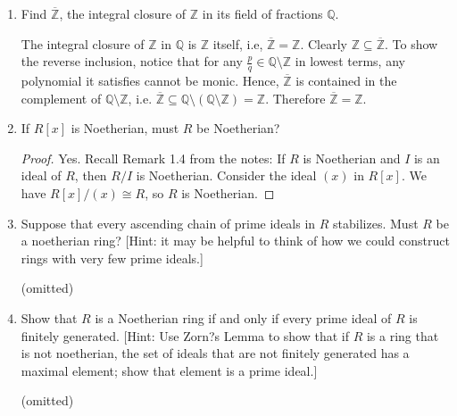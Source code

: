 \documentclass[11pt,oneside,english]{amsart}
\theoremstyle{definition}
\newcommand{\MB}[1]{\mathbb{#1}}
\begin{document}
\begin{enumerate}[leftmargin=*]
\item Find $\overline{\MB{Z}}$, the integral closure of $\MB{Z}$ in its field of fractions $\MB{Q}$.


The integral closure of $\MB{Z}$ in $\MB{Q}$ is $\MB{Z}$ itself, i.e, $\overline{\MB{Z}}=\MB{Z}$. Clearly $\MB{Z}\subseteq\overline{\MB{Z}}$. To show the reverse inclusion, notice that for any $\frac{p}{q}\in\MB{Q}\setminus\MB{Z}$ in lowest terms, any polynomial it satisfies cannot be monic. Hence, $\overline{\MB{Z}}$ is contained in the complement of $\MB{Q}\setminus\MB{Z}$, i.e. $\overline{\MB{Z}}\subseteq\MB{Q}\setminus(\MB{Q}\setminus\MB{Z})=\MB{Z}$. Therefore $\overline{\MB{Z}}=\MB{Z}$.



\item If $R[x]$ is Noetherian, must $R$ be Noetherian?


\begin{proof}
Yes. Recall Remark 1.4 from the notes: If $R$ is Noetherian and $I$ is an ideal of $R$, then $R/I$ is Noetherian. Consider the ideal $(x)$ in $R[x]$. We have $R[x]/(x)\cong R$, so $R$ is Noetherian.
\end{proof}


\item Suppose that every ascending chain of prime ideals in $R$ stabilizes. Must $R$ be a noetherian ring? [Hint: it may be helpful to think of how we could construct rings with very few prime ideals.]

(omitted)

\item Show that $R$ is a Noetherian ring if and only if every prime ideal of $R$ is finitely generated. [Hint: Use Zorn?s Lemma to show that if $R$ is a ring that is not noetherian, the set of ideals that are not finitely generated has a maximal element; show that element is a prime ideal.]

(omitted)
\end{enumerate}
\end{document}
